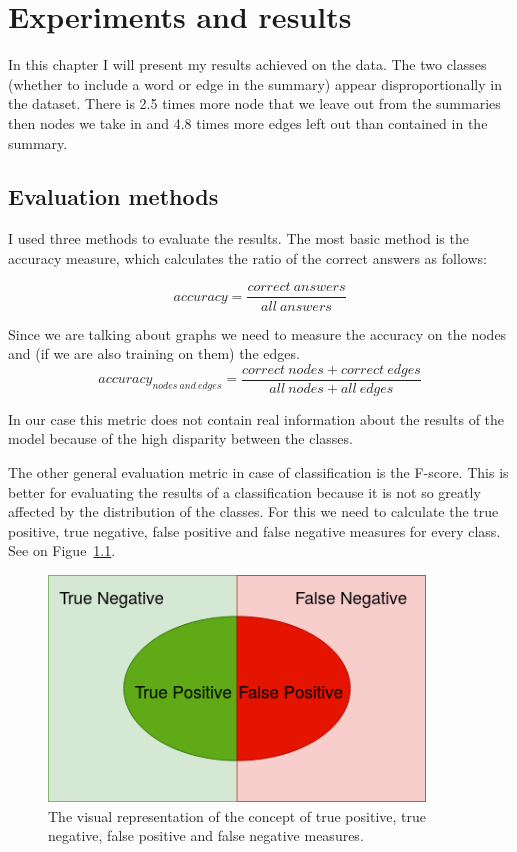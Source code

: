 \chapter{Experiments and results}\label{sect:Experiments}

In this chapter I will present my results achieved on the data. The two classes (whether to include a word or edge in the summary) appear disproportionally in the dataset. There is 2.5 times more node that we leave out from the summaries then nodes we take in and 4.8 times more edges left out than contained in the summary.

\section{Evaluation methods}

I used three methods to evaluate the results. The most basic method is the accuracy measure, which calculates the ratio of the correct answers as follows:

\[accuracy = \frac{correct\ answers}{all\ answers}\]

Since we are talking about graphs we need to measure the accuracy on the nodes and (if we are also training on them) the edges.
\[accuracy_{nodes\ and\ edges} = \frac{correct\ nodes + correct\ edges}{all\ nodes + all\ edges}\]

In our case this metric does not contain real information about the results of the model because of the high disparity between the classes.

The other general evaluation metric in case of classification is the F-score. This is better for evaluating the results of a classification because it is not so greatly affected by the distribution of the classes. For this we need to calculate the true positive, true negative, false positive and false negative measures for every class. See on Figue~\ref{fig:TP_TN_FP_FN}.

\begin{figure}[!ht]
	\centering
	\includegraphics[width=100mm, keepaspectratio]{figures/F_score.png}
	\caption{The visual representation of the concept of true positive, true negative, false positive and false negative measures.}
	\label{fig:TP_TN_FP_FN}
\end{figure}


